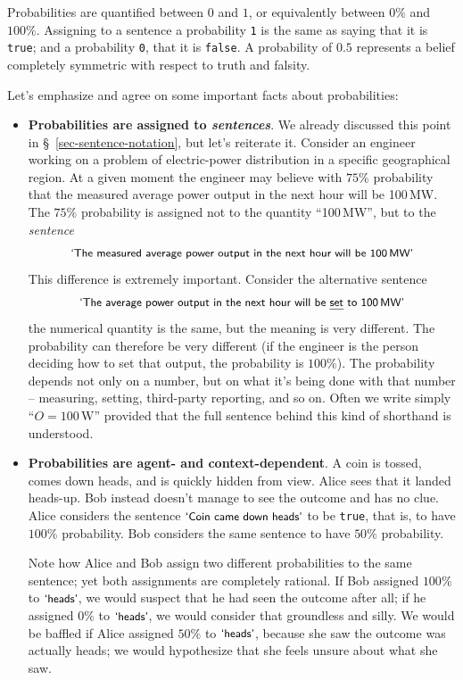 \documentclass[
  a4paper,
  DIV=11,
  numbers=noendperiod,
  oneside]{scrreprt}
\begin{document}
Probabilities are quantified between \(0\) and \(1\), or equivalently
between \(0\%\) and \(100\%\). Assigning to a sentence a probability
\texttt{1} is the same as saying that it is \texttt{true}; and a
probability \texttt{0}, that it is \texttt{false}. A probability of
\(0.5\) represents a belief completely symmetric with respect to truth
and falsity.

Let's emphasize and agree on some important facts about probabilities:

\begin{itemize}
\item
  {\textbf{ Probabilities are assigned to
  \emph{sentences}}}. We already discussed this point in
  §~\ref{sec-sentence-notation}, but let's reiterate it. Consider an
  engineer working on a problem of electric-power distribution in a
  specific geographical region. At a given moment the engineer may
  believe with \(75\%\) probability that the measured average power
  output in the next hour will be 100\,MW. The \(75\%\) probability is
  assigned not to the quantity ``100\,MW'', but to the \emph{sentence}
  \[
  \textsf{\small`The measured average power output in the next hour will be 100\,MW'}
  \] This difference is extremely important. Consider the alternative
  sentence \[
  \textsf{\small`The average power output in the next hour will be \emph{set} to 100\,MW'}
  \] the numerical quantity is the same, but the meaning is very
  different. The probability can therefore be very different (if the
  engineer is the person deciding how to set that output, the
  probability is \(100\%\)). The probability depends not only on a
  number, but on what it's being done with that number -- measuring,
  setting, third-party reporting, and so on. Often we write simply
  {``\(O = \mathrm{100\,W}\)''} provided that the full sentence behind
  this kind of shorthand is understood.
\item
  {\textbf{ Probabilities are agent- and
  context-dependent}}. A coin is tossed, comes down heads, and is
  quickly hidden from view. Alice sees that it landed heads-up. Bob
  instead doesn't manage to see the outcome and has no clue. Alice
  considers the sentence \(\textsf{\small`Coin came down heads'}\) to be
  \texttt{true}, that is, to have \(100\%\) probability. Bob considers
  the same sentence to have \(50\%\) probability.

  Note how Alice and Bob assign two different probabilities to the same
  sentence; yet both assignments are completely rational. If Bob
  assigned \(100\%\) to \(\textsf{\small`heads'}\), we would suspect
  that he had seen the outcome after all; if he assigned \(0\%\) to
  \(\textsf{\small`heads'}\), we would consider that groundless and
  silly. We would be baffled if Alice assigned \(50\%\) to
  \(\textsf{\small`heads'}\), because she saw the outcome was actually
  heads; we would hypothesize that she feels unsure about what she saw.


\end{itemize}
\end{document}
